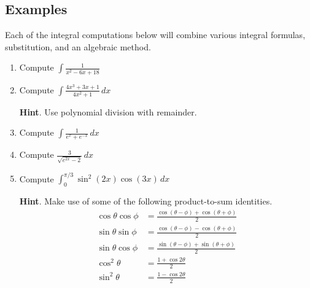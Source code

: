 \documentclass[11pt]{article}
\theoremstyle{definition}
\theoremstyle{named}
\numberwithin{myalgctr}{section}
\begin{document}
\newpage



\subsection*{Examples}
Each of the integral computations below will combine various integral formulas, substitution, and an algebraic method.
\begin{enumerate}
  \item Compute $\displaystyle \int \frac{1}{x^2-6x+18}$
  \item Compute $\displaystyle \int \frac{4x^3+3x+1}{4x^2+1}\, dx$

  {\bf Hint}. Use polynomial division with remainder.
  \item Compute $\displaystyle\int \frac{1}{e^x+e^{-x}}\, dx$
  \item Compute $\displaystyle \frac{3}{\sqrt{e^{2x}-2}}\, dx$

  \item Compute $\displaystyle \int_0^{\pi/3}\sin^2(2x)\cos(3x) \, dx$

  {\bf Hint}. Make use of some of the following product-to-sum identities.
  \begin{align}
    \cos\theta\cos\phi&=\frac{\cos(\theta-\phi)+\cos(\theta+\phi)}{2} \\
    \sin\theta\sin\phi&=\frac{\cos(\theta-\phi)-\cos(\theta+\phi)}{2} \\
    \sin\theta\cos\phi&= \frac{\sin(\theta-\phi)+\sin(\theta+\phi)}{2}\\
    \cos^2\theta&=\frac{1+\cos2\theta}{2}\\
    \sin^2\theta&=\frac{1-\cos2\theta}{2}
  \end{align}

\end{enumerate}
\end{document}
